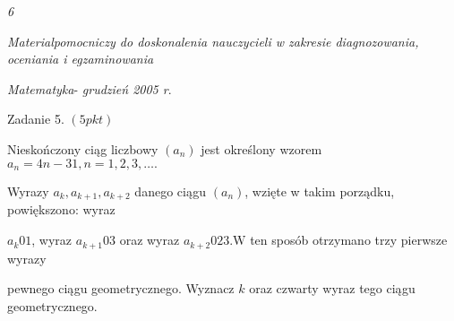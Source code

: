 \documentclass[a4paper,12pt]{article}
\begin{document}
{\it 6}

{\it Materialpomocniczy do doskonalenia nauczycieli w zakresie diagnozowania, oceniania i egzaminowania}

{\it Matematyka}- {\it grudzień 2005 r}.

Zadanie 5. $(5pkt)$

Nieskończony ciąg liczbowy $(a_{n})$ jest określony wzorem $a_{n}=4n-31, n=1,2,3,\ldots.$

Wyrazy $a_{k}, a_{k+1}, a_{k+2}$ danego ciągu $(a_{n})$, wzięte w takim porządku, powiększono: wyraz

$a_{k} 01$, wyraz $a_{k+1} 03$ oraz wyraz $a_{k+2}023. \mathrm{W}$ ten sposób otrzymano trzy pierwsze wyrazy

pewnego ciągu geometrycznego. Wyznacz $k$ oraz czwarty wyraz tego ciągu geometrycznego.
\end{document}
